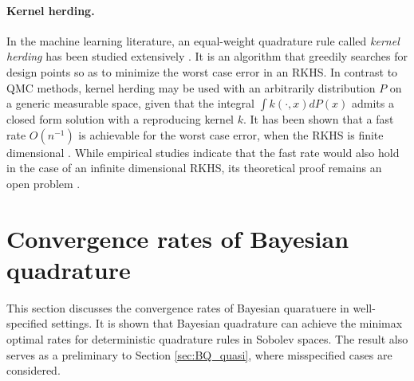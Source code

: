 \documentclass[11pt]{article}
\theoremstyle{remark}
\theoremstyle{example}
\theoremstyle{remark}
\newcommand{\cd}{\cdot}
\newcommand{\citep}{\cite}
\begin{document}
\paragraph{Kernel herding.}
In the machine learning literature, an equal-weight quadrature rule called {\em kernel herding} \cite{CheWelSmo10} has been studied extensively \citep{HusDuv12,BacJulObo12,LacLinBac15,KanNisGreFuk16}.
It is an algorithm that greedily searches for design points so as to minimize the worst case error in an RKHS.
In contrast to QMC methods, kernel herding may be used with an arbitrarily distribution $P$ on a generic measurable space, given that the integral $\int k(\cd,x)dP(x)$ admits a closed form solution with a reproducing kernel $k$.
It has been shown that a fast rate $O(n^{-1})$ is achievable for the worst case error, when the RKHS is finite dimensional \citep{CheWelSmo10}.
While empirical studies indicate that the fast rate would also hold in the case of an infinite dimensional RKHS, its theoretical proof remains an open problem \citep{BacJulObo12}.

























\section{Convergence rates of Bayesian quadrature} \label{sec:BQ_well}

This section discusses the convergence rates of Bayesian quaratuere in well-specified settings.  
It is shown that Bayesian quadrature can achieve the minimax optimal rates for deterministic quadrature rules in Sobolev spaces.   
The result also serves as a preliminary to Section \ref{sec:BQ_quasi}, where misspecified cases are considered.
 
\end{document}
